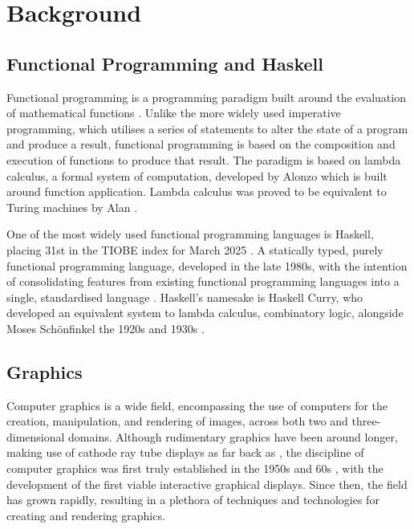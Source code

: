 \documentclass[../main.tex]{subfiles}
\begin{document}
\chapter{Background} \label{ch:background}
    \section{Functional Programming and Haskell}
        Functional programming is a programming paradigm built around the evaluation of
            mathematical functions \citep{fpPaulHudak}.
        Unlike the more widely used imperative programming, which utilises a series of
            statements to alter the state of a program and produce a result, functional
            programming is based on the composition and execution of functions to produce
            that result.
        The paradigm is based on lambda calculus, a formal system of computation,
            developed by Alonzo \citet{lambdaCalculus} which is built around function
            application.
        Lambda calculus was proved to be equivalent to Turing machines by Alan
            \citet{lambdaTuringComplete}.

        One of the most widely used functional programming languages is Haskell,
            placing 31st in the TIOBE index for March 2025 \citep{tiobeIndex}.
        A statically typed, purely functional programming language, developed in the
            late 1980s, with the intention of consolidating features from existing
            functional programming languages into a single, standardised language
            \citep{haskellConference}.
        Haskell's namesake is Haskell Curry, who developed an equivalent system to
            lambda calculus, combinatory logic, alongside Moses Schönfinkel the 1920s and
            1930s \citep{combinatoryLogic}.

    \section{Graphics}
        Computer graphics is a wide field, encompassing the use of computers for the
            creation, manipulation, and rendering of images, across both two and
            three-dimensional domains.
        Although rudimentary graphics have been around longer, making use of cathode
            ray tube displays as far back as \citet{crtBraun}, the discipline of computer
            graphics was first truly established in the 1950s and 60s \citep{graphics},
            with the development of the first viable interactive graphical displays.
        Since then, the field has grown rapidly, resulting in a plethora of techniques
            and technologies for creating and rendering graphics.
\end{document}
